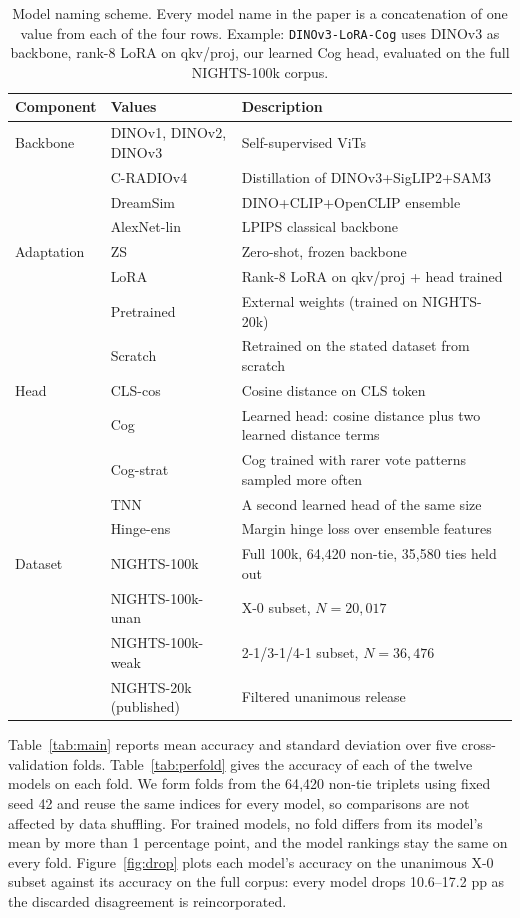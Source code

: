 \begin{table}[!ht]
\caption{Model naming scheme. Every model name in the paper is a concatenation of one value from each of the four rows. Example: \texttt{DINOv3-LoRA-Cog} uses DINOv3 as backbone, rank-8 LoRA on qkv/proj, our learned Cog head, evaluated on the full NIGHTS-100k corpus.}
\label{tab:naming}
\centering
\small
\setlength{\tabcolsep}{4pt}
\begin{tabular}{lll}
\toprule
Component & Values & Description \\
\midrule
Backbone & DINOv1, DINOv2, DINOv3 & Self-supervised ViTs \\
 & C-RADIOv4 & Distillation of DINOv3+SigLIP2+SAM3 \\
 & DreamSim & DINO+CLIP+OpenCLIP ensemble \\
 & AlexNet-lin & LPIPS classical backbone \\
\midrule
Adaptation & ZS & Zero-shot, frozen backbone \\
 & LoRA & Rank-8 LoRA on qkv/proj + head trained \\
 & Pretrained & External weights (trained on NIGHTS-20k) \\
 & Scratch & Retrained on the stated dataset from scratch \\
\midrule
Head & CLS-cos & Cosine distance on CLS token \\
 & Cog & Learned head: cosine distance plus two learned distance terms \\
 & Cog-strat & Cog trained with rarer vote patterns sampled more often \\
 & TNN & A second learned head of the same size \\
 & Hinge-ens & Margin hinge loss over ensemble features \\
\midrule
Dataset & NIGHTS-100k & Full 100k, 64{,}420 non-tie, 35{,}580 ties held out \\
 & NIGHTS-100k-unan & X-0 subset, $N{=}20{,}017$ \\
 & NIGHTS-100k-weak & 2-1/3-1/4-1 subset, $N{=}36{,}476$ \\
 & NIGHTS-20k (published) & Filtered unanimous release \\
\bottomrule
\end{tabular}
\end{table}

\clearpage
{}
\vspace{1em}

Table~\ref{tab:main} reports mean accuracy and standard deviation over five cross-validation folds. Table~\ref{tab:perfold} gives the accuracy of each of the twelve models on each fold. We form folds from the 64{,}420 non-tie triplets using fixed seed 42 and reuse the same indices for every model, so comparisons are not affected by data shuffling. For trained models, no fold differs from its model's mean by more than 1 percentage point, and the model rankings stay the same on every fold. Figure~\ref{fig:drop} plots each model's accuracy on the unanimous X-0 subset against its accuracy on the full corpus: every model drops 10.6--17.2 pp as the discarded disagreement is reincorporated.

